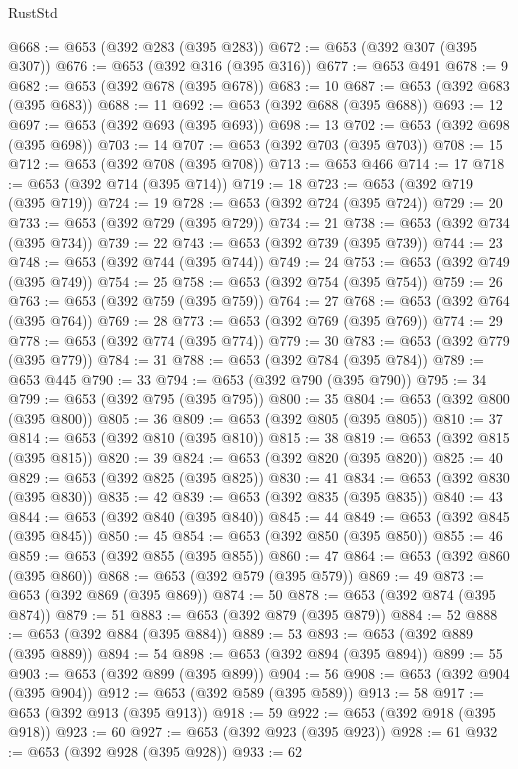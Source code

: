 \begin{lexlean}{RustStd}
\begin{coremodule}
{\begin{coremodule}
{{{{{{{{{{{{@668 := @653 (@392 @283 (@395 @283))
@672 := @653 (@392 @307 (@395 @307))
@676 := @653 (@392 @316 (@395 @316))
@677 := @653 @491
@678 := 9
@682 := @653 (@392 @678 (@395 @678))
@683 := 10
@687 := @653 (@392 @683 (@395 @683))
@688 := 11
@692 := @653 (@392 @688 (@395 @688))
@693 := 12
@697 := @653 (@392 @693 (@395 @693))
@698 := 13
@702 := @653 (@392 @698 (@395 @698))
@703 := 14
@707 := @653 (@392 @703 (@395 @703))
@708 := 15
@712 := @653 (@392 @708 (@395 @708))
@713 := @653 @466
@714 := 17
@718 := @653 (@392 @714 (@395 @714))
@719 := 18
@723 := @653 (@392 @719 (@395 @719))
@724 := 19
@728 := @653 (@392 @724 (@395 @724))
@729 := 20
@733 := @653 (@392 @729 (@395 @729))
@734 := 21
@738 := @653 (@392 @734 (@395 @734))
@739 := 22
@743 := @653 (@392 @739 (@395 @739))
@744 := 23
@748 := @653 (@392 @744 (@395 @744))
@749 := 24
@753 := @653 (@392 @749 (@395 @749))
@754 := 25
@758 := @653 (@392 @754 (@395 @754))
@759 := 26
@763 := @653 (@392 @759 (@395 @759))
@764 := 27
@768 := @653 (@392 @764 (@395 @764))
@769 := 28
@773 := @653 (@392 @769 (@395 @769))
@774 := 29
@778 := @653 (@392 @774 (@395 @774))
@779 := 30
@783 := @653 (@392 @779 (@395 @779))
@784 := 31
@788 := @653 (@392 @784 (@395 @784))
@789 := @653 @445
@790 := 33
@794 := @653 (@392 @790 (@395 @790))
@795 := 34
@799 := @653 (@392 @795 (@395 @795))
@800 := 35
@804 := @653 (@392 @800 (@395 @800))
@805 := 36
@809 := @653 (@392 @805 (@395 @805))
@810 := 37
@814 := @653 (@392 @810 (@395 @810))
@815 := 38
@819 := @653 (@392 @815 (@395 @815))
@820 := 39
@824 := @653 (@392 @820 (@395 @820))
@825 := 40
@829 := @653 (@392 @825 (@395 @825))
@830 := 41
@834 := @653 (@392 @830 (@395 @830))
@835 := 42
@839 := @653 (@392 @835 (@395 @835))
@840 := 43
@844 := @653 (@392 @840 (@395 @840))
@845 := 44
@849 := @653 (@392 @845 (@395 @845))
@850 := 45
@854 := @653 (@392 @850 (@395 @850))
@855 := 46
@859 := @653 (@392 @855 (@395 @855))
@860 := 47
@864 := @653 (@392 @860 (@395 @860))
@868 := @653 (@392 @579 (@395 @579))
@869 := 49
@873 := @653 (@392 @869 (@395 @869))
@874 := 50
@878 := @653 (@392 @874 (@395 @874))
@879 := 51
@883 := @653 (@392 @879 (@395 @879))
@884 := 52
@888 := @653 (@392 @884 (@395 @884))
@889 := 53
@893 := @653 (@392 @889 (@395 @889))
@894 := 54
@898 := @653 (@392 @894 (@395 @894))
@899 := 55
@903 := @653 (@392 @899 (@395 @899))
@904 := 56
@908 := @653 (@392 @904 (@395 @904))
@912 := @653 (@392 @589 (@395 @589))
@913 := 58
@917 := @653 (@392 @913 (@395 @913))
@918 := 59
@922 := @653 (@392 @918 (@395 @918))
@923 := 60
@927 := @653 (@392 @923 (@395 @923))
@928 := 61
@932 := @653 (@392 @928 (@395 @928))
@933 := 62
}}}}}}}}}}}}
\end{coremodule}}
\end{coremodule}
\end{lexlean}
